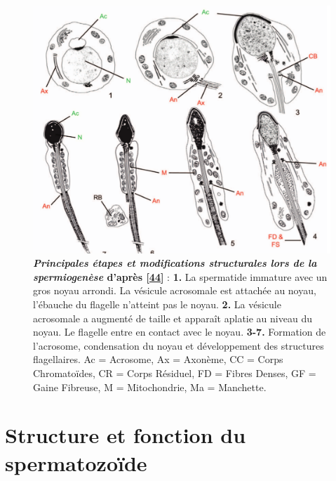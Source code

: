 \documentclass[12pt,a4paper,twoside]{ugathesis}
\theoremstyle{definition}
\theoremstyle{definition}
\theoremstyle{definition}
\theoremstyle{remark}
\begin{document}
\begin{figure}

{\centering \includegraphics[scale=0.3]{figure/spermiogenese} 

}

\caption[Principales étapes et modifications structurales lors de la spermiogenèse]{\textbf{\emph{Principales étapes et modifications
structurales lors de la spermiogenèse} d'après
{[}\protect\hyperlink{ref-Toure2011}{44}{]}} : \textbf{1.} La spermatide
immature avec un gros noyau arrondi. La vésicule acrosomale est attachée
au noyau, l'ébauche du flagelle n'atteint pas le noyau. \textbf{2.} La
vésicule acrosomale a augmenté de taille et apparaît aplatie au niveau
du noyau. Le flagelle entre en contact avec le noyau. \textbf{3-7.}
Formation de l'acrosome, condensation du noyau et développement des
structures flagellaires. Ac = Acrosome, Ax = Axonème, CC = Corps
Chromatoïdes, CR = Corps Résiduel, FD = Fibres Denses, GF = Gaine
Fibreuse, M = Mitochondrie, Ma = Manchette.}\label{fig:spermiogenese}
\end{figure}













\newpage  

\section{Structure et fonction du
spermatozoïde}\label{structure-et-fonction-du-spermatozoide}
\end{document}
